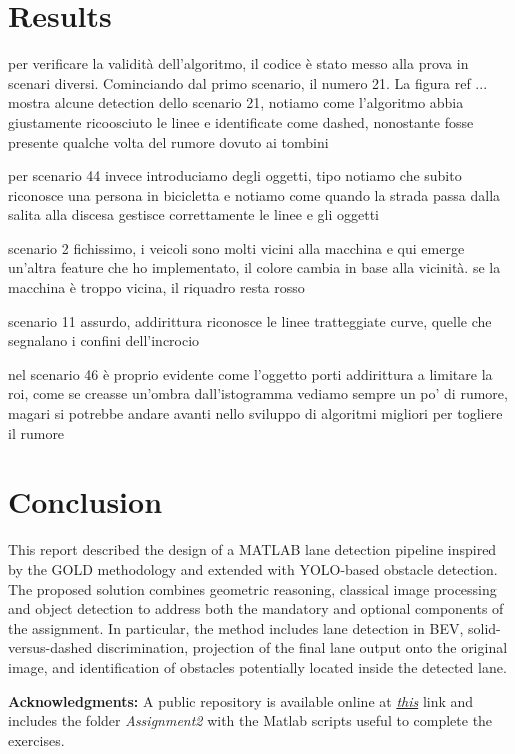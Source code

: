 \documentclass[conference]{IEEEtran}
\newcommand{\acknowledgments}[1]{\textbf{Acknowledgments:} #1}
\begin{document}
\section{Results}
per verificare la validità dell'algoritmo, il codice è stato messo alla prova in scenari diversi. 
Cominciando dal primo scenario, il numero 21. La figura ref ... mostra alcune detection dello scenario 21, notiamo come l'algoritmo abbia giustamente ricoosciuto le linee e identificate come dashed, nonostante fosse presente qualche volta del rumore dovuto ai tombini

per scenario 44 invece introduciamo degli oggetti, tipo notiamo che subito riconosce una persona in bicicletta e notiamo come quando la strada passa dalla salita alla discesa gestisce correttamente le linee e gli oggetti

scenario 2 fichissimo, i veicoli sono molti vicini alla macchina e qui emerge un'altra feature che ho implementato, il colore cambia in base alla vicinità. se la macchina è troppo vicina, il riquadro resta rosso

scenario 11 assurdo, addirittura riconosce le linee tratteggiate curve, quelle che segnalano i confini dell'incrocio

nel scenario 46 è proprio evidente come l'oggetto porti addirittura a limitare la roi, come se creasse un'ombra
dall'istogramma vediamo sempre un po' di rumore, magari si potrebbe andare avanti nello sviluppo di algoritmi migliori per togliere il rumore 

\section{Conclusion}
This report described the design of a MATLAB lane detection pipeline inspired by the GOLD methodology and extended with YOLO-based obstacle detection. The proposed solution combines geometric reasoning, classical image processing and object detection to address both the mandatory and optional components of the assignment. In particular, the method includes lane detection in BEV, solid-versus-dashed discrimination, projection of the final lane output onto the original image, and identification of obstacles potentially located inside the detected lane.





\vspace{8pt}
\acknowledgments{A public repository is available online at \href{https://github.com/annamaroma/Technologies4AutonomousVehicles}{\textit{this}} link and includes the folder \textit{Assignment2} with the Matlab scripts useful to complete the exercises.}
\end{document}
